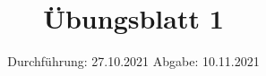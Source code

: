 

\subject{Elektronik}
\title{Übungsblatt 1}
\date{%
  Durchführung: 27.10.2021
  \hspace{3em}
  Abgabe: 10.11.2021
}



\maketitle
\thispagestyle{empty}
\tableofcontents
\newpage






\printbibliography{}


